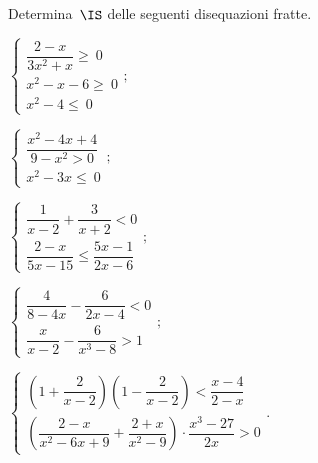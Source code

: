 \begin{esercizio}[\Ast]
\label{ese:20.67}
Determina~$\IS$ delle seguenti disequazioni fratte.

\begin{enumeratea}{\longarray
 \item $\left\{\begin{array}{l}
		\dfrac{2-x}{3x^{2}+x}\ge~0\\
		x^{2}-x-6\ge~0\\
		x^{2}-4\le~0
	\end{array}\right.;$
\item $\left\{\begin{array}{l}
        \dfrac{x^{2}-4x+4}{9-x^{2}>0}\\
        x^{2}-3x\le~0
       \end{array}\right.;$
\item $\left\{\begin{array}{l}
	   \dfrac{1}{x-2}+\dfrac{3}{x+2}<0\\
	   \dfrac{2-x}{5x-15}\le\dfrac{5x-1}{2x-6}
	   \end{array}\right.;$
\item $\left\{\begin{array}{l}
	   \dfrac{4}{8-4x}-\dfrac{6}{2x-4}<0\\
	   \dfrac{x}{x-2}-\dfrac{6}{x^{3}-8}>1
	   \end{array}\right.;$
\item $\left\{\begin{array}{l}
	   \left(1+\dfrac{2}{x-2}\right)\left(1-\dfrac{2}{x-2}\right)<\dfrac{x-4}{2-x}\\
	   \left(\dfrac{2-x}{x^{2}-6x+9}+\dfrac{2+x}{x^{2}-9}\right)\cdot{\dfrac{x^{3}-27}{2x}}>0
	   \end{array}\right..$}
\end{enumeratea}

\end{esercizio}

